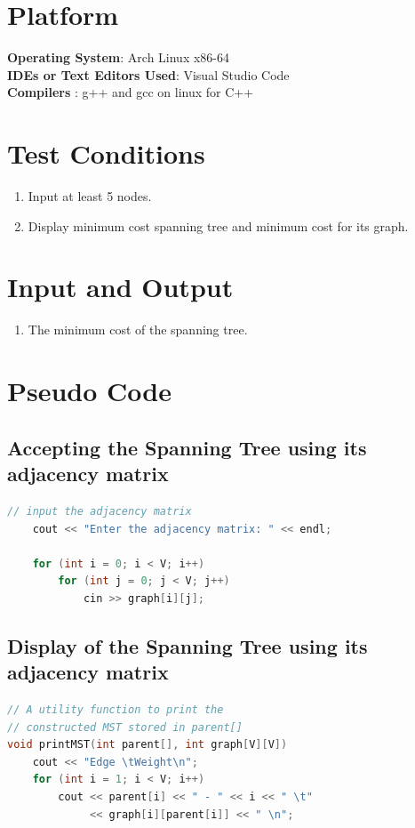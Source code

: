 \documentclass[11pt]{article}
\begin{document}
\section{Platform}
\textbf{\textbf{Operating System}}: Arch Linux x86-64 \\
\textbf{\textbf{IDEs or Text Editors Used}}: Visual Studio Code\\
\textbf{\textbf{Compilers} }: g++ and gcc on linux for C++\\

\section{Test Conditions}
\begin{enumerate}
    \item Input at least 5 nodes.
    \item Display minimum cost spanning tree and minimum cost for its graph.
\end{enumerate}

\section{Input and Output}
\begin{enumerate}
    \item The minimum cost of the spanning tree.
\end{enumerate}

\section{Pseudo Code}
\subsection{Accepting the Spanning Tree using its adjacency matrix}
\begin{lstlisting}[language=C++]
    // input the adjacency matrix
    cout << "Enter the adjacency matrix: " << endl;

    for (int i = 0; i < V; i++)
        for (int j = 0; j < V; j++)
            cin >> graph[i][j];
\end{lstlisting}
\subsection{Display of the Spanning Tree using its adjacency matrix}
\begin{lstlisting}[language=C++]
// A utility function to print the
// constructed MST stored in parent[]
void printMST(int parent[], int graph[V][V])
    cout << "Edge \tWeight\n";
    for (int i = 1; i < V; i++)
        cout << parent[i] << " - " << i << " \t"
             << graph[i][parent[i]] << " \n";
\end{lstlisting}
\end{document}
